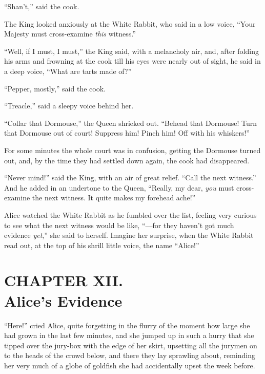 \documentclass[11pt,openany,oneside]{book}
\begin{document}
“Shan’t,” said the cook. 

The King looked anxiously at the White Rabbit, who said in a low voice, “Your Majesty must cross-examine {\em this\/} witness.” 

“Well, if I must, I must,” the King said, with a melancholy air, and, after folding his arms and frowning at the cook till his eyes were nearly out of sight, he said in a deep voice, “What are tarts made of?” 

“Pepper, mostly,” said the cook. 

“Treacle,” said a sleepy voice behind her. 

“Collar that Dormouse,” the Queen shrieked out. “Behead that Dormouse! Turn that Dormouse out of court! Suppress him! Pinch him! Off with his whiskers!” 

For some minutes the whole court was in confusion, getting the Dormouse turned out, and, by the time they had settled down again, the cook had disappeared. 

“Never mind!” said the King, with an air of great relief. “Call the next witness.” And he added in an undertone to the Queen, “Really, my dear, {\em you\/} must cross-examine the next witness. It quite makes my forehead ache!” 

Alice watched the White Rabbit as he fumbled over the list, feeling very curious to see what the next witness would be like, “—for they haven’t got much evidence {\em yet\/},” she said to herself. Imagine her surprise, when the White Rabbit read out, at the top of his shrill little voice, the name “Alice!” 


\clearpage{}
{}
\chapter*{CHAPTER XII.\\  Alice’s Evidence}
\leavevmode\hypertarget{d15.fp188591}{}“Here!” cried Alice, quite forgetting in the flurry of the moment how large she had grown in the last few minutes, and she jumped up in such a hurry that she tipped over the jury-box with the edge of her skirt, upsetting all the jurymen on to the heads of the crowd below, and there they lay sprawling about, reminding her very much of a globe of goldfish she had accidentally upset the week before. 
\end{document}
